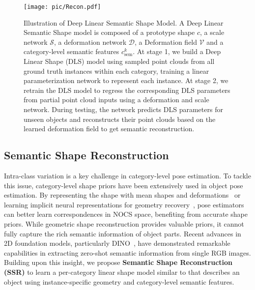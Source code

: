 \begin{figure*}[t]
    \centering
    \texttt{[image: pic/Recon.pdf]}
    \vspace{-0.6cm}
    \caption{Illustration of Deep Linear Semantic Shape Model. A Deep Linear Semantic Shape model is composed of a prototype shape $c$, a scale network $\mathcal{S}$, a deformation network $\mathcal{D}$, a Deformation field $\mathcal{V}$ and a category-level semantic features $c^k_\text{sem}$. At stage 1, we build a Deep Linear Shape (DLS) model using sampled point clouds from all ground truth instances within each category, training a linear parameterization network to represent each instance. At stage 2, we retrain the DLS model to regress the corresponding DLS parameters from partial point cloud inputs using a deformation and scale network. During testing, the network predicts DLS parameters for unseen objects and reconstructs their point clouds based on the learned deformation field to get semantic reconstruction.}
    \vspace{-0.3cm}
    \label{fig:pipeline_deep_lineaer}
\end{figure*}

\subsection{Semantic Shape Reconstruction} \label{subsec:dlssr}
Intra-class variation is a key challenge in category-level pose estimation. To tackle this issue, category-level shape priors have been extensively used in object pose estimation. By representing the shape with mean shapes and deformations~\cite{tian2020shape} or learning implicit neural representations for geometry recovery~\cite{irshad2022shapo, irshad2022centersnap}, pose estimators can better learn correspondences in NOCS space, benefiting from accurate shape priors. While geometric shape reconstruction provides valuable priors, it cannot fully capture the rich semantic information of object parts. Recent advances in 2D foundation models, particularly DINO~\cite{oquab2023dinov2}, have demonstrated remarkable capabilities in extracting zero-shot semantic information from single RGB images. Building upon this insight, we propose \textbf{Semantic Shape Reconstruction (SSR)} to learn a per-category linear shape model similar to \cite{loiseau2021representing} that describes an object using instance-specific geometry and category-level semantic features.


